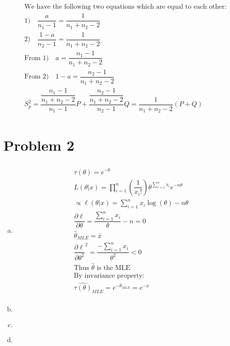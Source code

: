 \documentclass{article}
\newcommand{\hth}{\hat{\theta}}
\newcommand{\prodn}{\prod_{i=1}^{n}}
\newcommand{\dll}[1]{\dfrac{\partial\ell}{\partial{#1}}}
\newcommand{\mle}{\hat{\theta}_{MLE}}
\newcommand{\sumx}{\sum_{i=1}^{n}x_i}
\newcommand{\ta}{\theta}
\begin{document}
\begin{flushleft}
\begin{enumerate}[(a)]
\begin{multline*}
\text{We have the following two equations which are equal to each other:}\\
1) \quad \dfrac{a}{n_1-1}=\dfrac{1}{n_1+n_2-2}\\
2) \quad \dfrac{1-a}{n_2-1}=\dfrac{1}{n_1+n_2-2} \\
\text{From } 1) \quad a=\dfrac{n_1-1}{n_1+n_2-2}\\
\text{From } 2) \quad 1-a=\dfrac{n_2-1}{n_1+n_2-2}\\
S_p^2=\dfrac{\dfrac{n_1-1}{n_1+n_2-2}}{n_1-1}P+\dfrac{\dfrac{n_2-1}{n_1+n_2-2}}{n_2-1}Q
=\dfrac{1}{n_1+n_2-2}(P+Q)\\
\end{multline*}

\end{enumerate}
	\section*{Problem 2}
\begin{enumerate}[(a)]
	
	\item 
\begin{multline*}\\
\tau(\ta)=e^{-\ta}\\
L(\ta|x)=\prodn \left(\dfrac{1}{x_i!} \right) \ta^{\sumx}e^{-n\ta}\\
\propto \ell(\ta|x)=\sumx \log(\ta)-n\ta\\
\dll{\ta}=\dfrac{\sumx}{\ta}-n=0\\
\mle=\bar{x}\\
\dll{\ta^2}^2=\dfrac{-\sumx}{\ta^2}<0\\
\text{Thus } \hth \text{ is the MLE}\\
\text{By invariance property:}\\
\hat{\tau(\ta)}_{MLE}=e^{-\mle}=e^{-\bar{x}}\\
\end{multline*}

	\item 
\begin{multline*}\\
\end{multline*}

	\item 
\begin{multline*}\\
\end{multline*}

	\item 
\begin{multline*}\\
\end{multline*}
	
\end{enumerate}


\end{flushleft}
\end{document}
